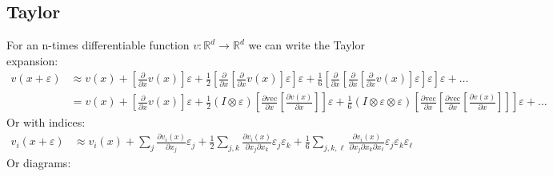 \documentclass[oneside]{book}
\newcommand{\R}{\mathbb R}
\newcommand{\eps}{\varepsilon}
\begin{document}
\subsection{Taylor}
For an n-times differentiable function $v: \R^d\to\R^d$ we can write the Taylor expansion:
\begin{align*}
    v(x + \eps)
    &\approx
    v(x)
    + \left[\frac{\partial}{\partial x} v(x)\right]\eps
    + \frac{1}{2}\left[\frac{\partial}{\partial x}\left[\frac{\partial}{\partial x} v(x)\right]\eps\right]\eps
    + \frac{1}{6}\left[\frac{\partial}{\partial x}\left[\frac{\partial}{\partial x} \left[\frac{\partial}{\partial x} v(x)\right]\eps\right]\eps\right]\eps
    + \dots
    \\
    &=
    v(x)
    + \left[\frac{\partial}{\partial x} v(x)\right]\eps
    +
    \frac{1}{2}
    (I \otimes \eps)
    \left[\frac{\partial\mathrm{vec}}{\partial x}\left[\frac{\partial v(x)}{\partial x} \right]\right]\eps
    + \frac{1}{6}
    (I \otimes \eps \otimes \eps)
    \left[\frac{\partial\mathrm{vec}}{\partial x}\left[\frac{\partial\mathrm{vec}}{\partial x} \left[\frac{\partial v(x)}{\partial x} \right]\right]\right]\eps
    + \dots
\end{align*}
Or with indices:
\begin{align*}
    v_i(x + \eps)
    &\approx
    v_i(x)
    + \sum_j \frac{\partial v_i(x)}{\partial x_j} \eps_j
    + \frac12 \sum_{j,k} \frac{\partial v_i(x)}{\partial x_j\partial x_k} \eps_j \eps_k
    + \frac16 \sum_{j,k,\ell} \frac{\partial v_i(x)}{\partial x_j\partial x_k\partial x_\ell} \eps_j \eps_k \eps_\ell
\end{align*}
Or diagrams:
\end{document}
